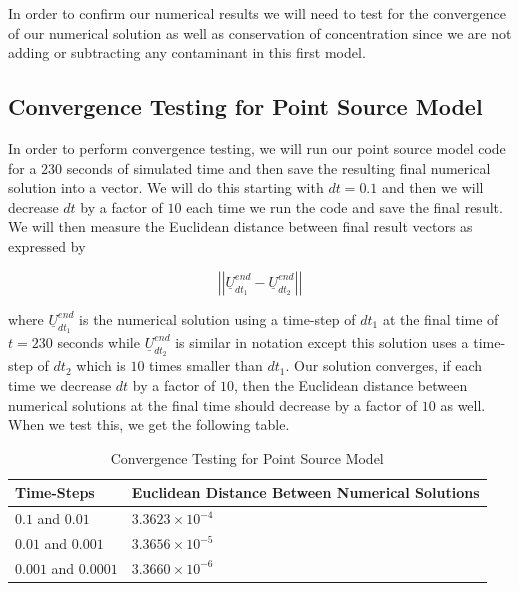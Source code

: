 \documentclass[a4paper]{article}
\theoremstyle{remark}
\theoremstyle{remark}
\begin{document}
\noindent In order to confirm our numerical results we will need to test for the convergence of our numerical solution as well as conservation of concentration since we are not adding or subtracting any contaminant in this first model.


\subsection{Convergence Testing for Point Source Model} \label{ConvergencePointModelSection}
In order to perform convergence testing, we will run our point source model code for a $230$ seconds of simulated time and then save the resulting final numerical solution into a vector. We will do this starting with $dt=0.1$ and then we will decrease $dt$ by a factor of $10$ each time we run the code and save the final result. We will then measure the Euclidean distance between final result vectors as expressed by

\begin{equation} \label{convergencetest}
\left|\left| \underline{U}^{end}_{dt_{1}}-\underline{U}^{end}_{dt_{2}} \right|\right|
\end{equation}

\noindent where $\underline{U}^{end}_{dt_{1}}$ is the numerical solution using a time-step of $dt_{1}$ at the final time of $t=230$ seconds while $\underline{U}^{end}_{dt_{2}}$ is similar in notation except this solution uses a time-step of $dt_{2}$ which is $10$ times smaller than $dt_{1}$. Our solution converges, if each time we decrease $dt$ by a factor of $10$, then the Euclidean distance between numerical solutions at the final time should decrease by a factor of $10$ as well. When we test this, we get the following table.

\begin{table}[H]
\centering
\caption{Convergence Testing for Point Source Model}
\label{convergencemodelpoint}
\begin{tabular}{|l|l|}
\hline
Time-Steps           & Euclidean Distance Between Numerical Solutions \\ \hline
$0.1$ and $0.01$     & $3.3623 \times 10^{-4}$              \\ \hline
$0.01$ and $0.001$   & $3.3656 \times 10^{-5}$              \\ \hline
$0.001$ and $0.0001$ & $3.3660 \times 10^{-6}$                                    \\ \hline
\end{tabular}
\end{table}
\end{document}
